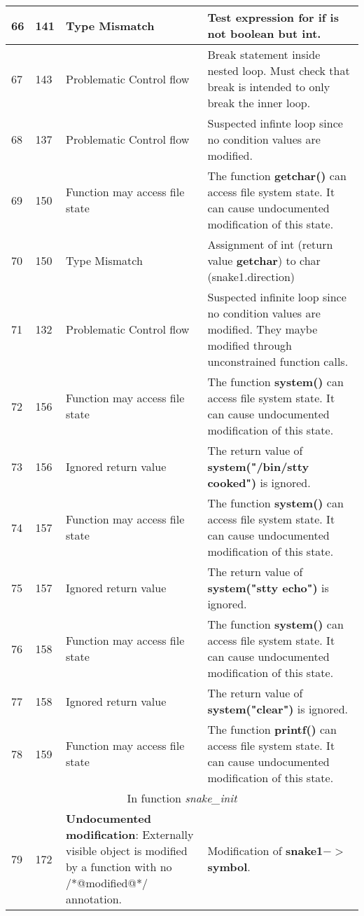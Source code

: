 \documentclass[]{article}
\begin{document}
\begin{longtable}{ |p{0.5cm}|p{0.75cm}|p{3cm}|p{9cm}|  }
		66 & 141 & Type Mismatch & Test expression for \textbf{if} is not boolean but int. \\ 
		\hline    
		67 & 143 & Problematic Control flow & Break statement inside nested loop. Must check that break is intended to only break the inner loop. \\
		\hline    
		68 & 137 & Problematic Control flow & Suspected infinte loop since no condition values are modified. \\
		\hline    
		69 & 150 & Function may access file state & The function \textbf{getchar()} can access file system state. It can cause undocumented modification of this state. \\
		\hline    
		70 & 150 & Type Mismatch & Assignment of int (return value \textbf{getchar}) to char (snake1.direction) \\
		\hline    
		71 & 132 & Problematic Control flow & Suspected infinite loop since no condition values are modified. They maybe modified through unconstrained function calls. \\
		\hline    
		72 & 156 & Function may access file state & The function \textbf{system()} can access file system state. It can cause undocumented modification of this state. \\
		\hline    
		73 & 156 & Ignored return value & The return value of \textbf{system("/bin/stty cooked")} is ignored. \\
		\hline    
		74 & 157 & Function may access file state & The function \textbf{system()} can access file system state. It can cause undocumented modification of this state. \\
		\hline    
		75 & 157 & Ignored return value & The return value of \textbf{system("stty echo")} is ignored. \\
		\hline    
		76 & 158 & Function may access file state & The function \textbf{system()} can access file system state. It can cause undocumented modification of this state. \\
		\hline    
		77 & 158 & Ignored return value & The return value of \textbf{system("clear")} is ignored. \\
		\hline    
		78 & 159 & Function may access file state & The function \textbf{printf()} can access file system state. It can cause undocumented modification of this state. \\
		\hline    
		\multicolumn{4}{|c|}{In function \textit{snake\_init}} \\
		\hline 
		79 & 172 & \multirow{8}{90.0pt}{\textbf{Undocumented modification}: Externally visible object is modified by a function with no /*@modified@*/ annotation.} & Modification of \textbf{snake1$->$symbol}.  \\

\end{longtable}
\end{document}
